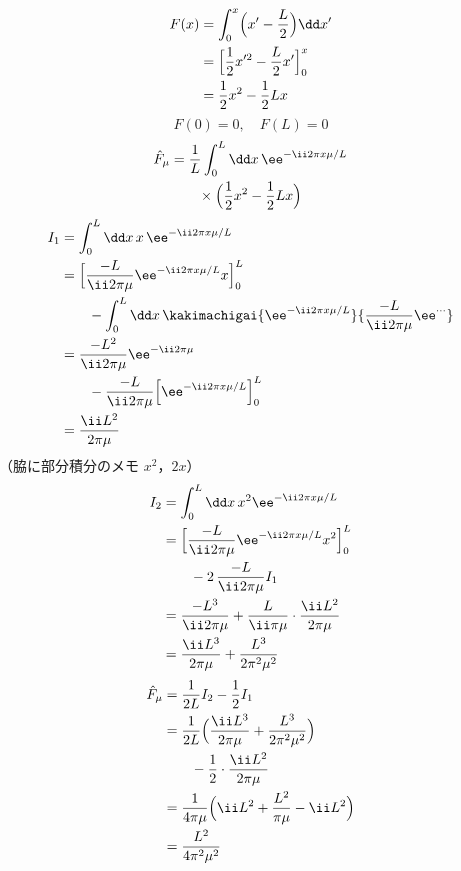 \begin{align*}
  F(x)&=\int_{0}^{x}\Bigl(x'-\frac{L}{2}\Bigr)\dd x'\\
  &=\Bigl[\frac{1}{2}x'^{2}-\frac{L}{2}x'\Bigr]_{0}^{x}\\
  &=\frac{1}{2}x^{2}-\frac{1}{2}Lx
\end{align*}
\[ F(0)=0,\quad F(L)=0 \]
\begin{align*}
  \hat{F}_{\mu}&=\frac{1}{L}\int_{0}^{L}\dd x\,\ee^{-\ii2\pi x\mu/L}\\
  &\qquad\times\Bigl(\frac{1}{2}x^{2}-\frac{1}{2}Lx\Bigr)
\end{align*}
\begin{align*}
  I_1&=\int_{0}^{L}\dd x\,x\,\ee^{-\ii2\pi x\mu/L}\\
  &=\Bigl[\frac{-L}{\ii2\pi\mu}\ee^{-\ii2\pi x\mu/L}x\Bigr]_{0}^{L}\\
  &\qquad-\int_{0}^{L}\dd x\,\kakimachigai{\ee^{-\ii2\pi x\mu/L}}{\frac{-L}{\ii2\pi\mu}\ee^{\cdots}}\\
  &=\frac{-L^{2}}{\ii2\pi\mu}\ee^{-\ii2\pi\mu}\\
  &\qquad-\frac{-L}{\ii2\pi\mu}\Bigl[\ee^{-\ii2\pi x\mu/L}\Bigr]_{0}^{L}\\
  &=\frac{\ii L^{2}}{2\pi\mu}
\end{align*}
（脇に部分積分のメモ $x^{2}$，$2x$）
\begin{align*}
  I_2&=\int_{0}^{L}\dd x\,x^{2}\ee^{-\ii2\pi x\mu/L}\\
  &=\Bigl[\frac{-L}{\ii2\pi\mu}\ee^{-\ii2\pi x\mu/L}x^{2}\Bigr]_{0}^{L}\\
  &\qquad-2\,\frac{-L}{\ii2\pi\mu}I_1\\
  &=\frac{-L^{3}}{\ii2\pi\mu}+\frac{L}{\ii\pi\mu}\cdot\frac{\ii L^{2}}{2\pi\mu}\\
  &=\frac{\ii L^{3}}{2\pi\mu}+\frac{L^{3}}{2\pi^{2}\mu^{2}}
\end{align*}
\begin{align*}
  \hat{F}_{\mu}&=\frac{1}{2L}I_2-\frac{1}{2}I_1\\
  &=\frac{1}{2L}\Bigl(\frac{\ii L^{3}}{2\pi\mu}+\frac{L^{3}}{2\pi^{2}\mu^{2}}\Bigr)\\
  &\qquad-\frac{1}{2}\cdot\frac{\ii L^{2}}{2\pi\mu}\\
  &=\frac{1}{4\pi\mu}\Bigl(\ii L^{2}+\frac{L^{2}}{\pi\mu}-\ii L^{2}\Bigr)\\
  &=\frac{L^{2}}{4\pi^{2}\mu^{2}}
\end{align*}
